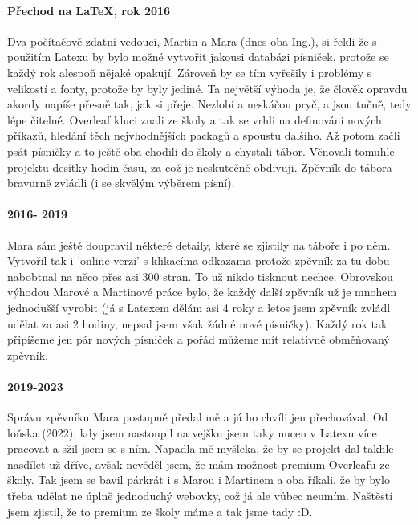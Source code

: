 \documentclass[12pt, notitlepage]{scrartcl}
\begin{document}
\paragraph{Přechod na \LaTeX, rok 2016}
Dva počítačově zdatní vedoucí, Martin a Mara (dnes oba Ing.), si řekli že s použitím Latexu by bylo možné vytvořit jakousi databázi písniček, protože se každý rok alespoň nějaké opakují. Zároveň by se tím vyřešily i problémy s velikostí a fonty, protože by byly jediné. Ta největší výhoda je, že člověk opravdu akordy napíše přesně tak, jak si přeje. Nezlobí a neskáčou pryč, a jsou tučně, tedy lépe čitelné. Overleaf kluci znali ze školy a tak se vrhli na definování nových příkazů, hledání těch nejvhodnějších packagů a spoustu dalšího. Až potom začli psát písničky a to ještě oba chodili do školy a chystali tábor. Věnovali tomuhle projektu desítky hodin času, za což je neskutečně obdivuji. Zpěvník do tábora bravurně zvládli (i se skvělým výběrem písní).

\paragraph{2016- 2019}
Mara sám ještě doupravil některé detaily, které se zjistily na táboře i po něm. Vytvořil tak i 'online verzi' s klikacíma odkazama protože zpěvník za tu dobu nabobtnal na něco přes asi 300 stran. To už nikdo tisknout nechce. Obrovskou výhodou Marové a Martinové práce bylo, že každý další zpěvník už je mnohem jednodušší vyrobit (já s Latexem dělám asi 4 roky a letos jsem zpěvník zvládl udělat za asi 2 hodiny, nepsal jsem však žádné nové písničky). Každý rok tak připíšeme jen pár nových písniček a pořád můžeme mít relativně obměňovaný zpěvník.

\paragraph{2019-2023}
Správu zpěvníku Mara postupně předal mě a já ho chvíli jen přechovával. Od loňska (2022), kdy jsem nastoupil na vejšku jsem taky nucen v Latexu více pracovat a sžil jsem se s ním. Napadla mě myšleka, že by se projekt dal takhle nasdílet už dříve, avšak nevěděl jsem, že mám možnost premium Overleafu ze školy. Tak jsem se bavil párkrát i s Marou i Martinem a oba říkali, že by bylo třeba udělat ne úplně jednoduchý webovky, což já ale vůbec neumím. Naštěstí jsem zjistil, že to premium ze školy máme a tak jsme tady :D.
\end{document}
